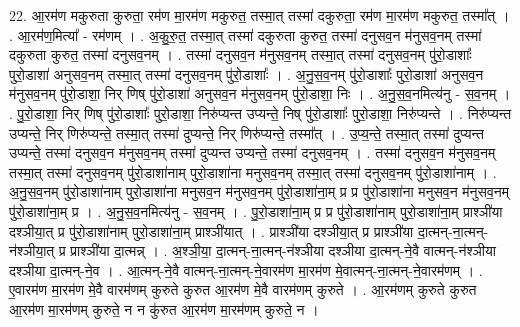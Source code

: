 \documentclass[17pt]{extarticle}
\begin{document}
22. आ॒रम॑ण मकुरुता कुरुता॒ रम॑ण मा॒रम॑ण मकुरुत॒ तस्मा॒त् तस्मा॑ दकुरुता॒ रम॑ण मा॒रम॑ण मकुरुत॒ तस्मा᳚त् । . आ॒रम॑ण॒मित्या᳚ - रम॑णम् । . अ॒कु॒रु॒त॒ तस्मा॒त् तस्मा॑ दकुरुता कुरुत॒ तस्मा॑ दनुसव॒न म॑नुसव॒नम् तस्मा॑ दकुरुता कुरुत॒ तस्मा॑ दनुसव॒नम् । . तस्मा॑ दनुसव॒न म॑नुसव॒नम् तस्मा॒त् तस्मा॑ दनुसव॒नम् पु॑रो॒डाशाः᳚ पुरो॒डाशा॑ अनुसव॒नम् तस्मा॒त् तस्मा॑ दनुसव॒नम् पु॑रो॒डाशाः᳚ । . अ॒नु॒स॒व॒नम् पु॑रो॒डाशाः᳚ पुरो॒डाशा॑ अनुसव॒न म॑नुसव॒नम् पु॑रो॒डाशा॒ निर् णिष् पु॑रो॒डाशा॑ अनुसव॒न म॑नुसव॒नम् पु॑रो॒डाशा॒ निः । . अ॒नु॒स॒व॒नमित्य॑नु - स॒व॒नम् । . पु॒रो॒डाशा॒ निर् णिष् पु॑रो॒डाशाः᳚ पुरो॒डाशा॒ निरु॑प्यन्त उप्यन्ते॒ निष् पु॑रो॒डाशाः᳚ पुरो॒डाशा॒ निरु॑प्यन्ते । . निरु॑प्यन्त उप्यन्ते॒ निर् णिरु॑प्यन्ते॒ तस्मा॒त् तस्मा॑ दुप्यन्ते॒ निर् णिरु॑प्यन्ते॒ तस्मा᳚त् । . उ॒प्य॒न्ते॒ तस्मा॒त् तस्मा॑ दुप्यन्त उप्यन्ते॒ तस्मा॑ दनुसव॒न म॑नुसव॒नम् तस्मा॑ दुप्यन्त उप्यन्ते॒ तस्मा॑ दनुसव॒नम् । . तस्मा॑ दनुसव॒न म॑नुसव॒नम् तस्मा॒त् तस्मा॑ दनुसव॒नम् पु॑रो॒डाशा॑नाम् पुरो॒डाशा॑ना मनुसव॒नम् तस्मा॒त् तस्मा॑ दनुसव॒नम् पु॑रो॒डाशा॑नाम् । . अ॒नु॒स॒व॒नम् पु॑रो॒डाशा॑नाम् पुरो॒डाशा॑ना मनुसव॒न म॑नुसव॒नम् पु॑रो॒डाशा॑ना॒म् प्र प्र पु॑रो॒डाशा॑ना मनुसव॒न म॑नुसव॒नम् पु॑रो॒डाशा॑ना॒म् प्र । . अ॒नु॒स॒व॒नमित्य॑नु - स॒व॒नम् । . पु॒रो॒डाशा॑ना॒म् प्र प्र पु॑रो॒डाशा॑नाम् पुरो॒डाशा॑ना॒म् प्राश्ञी॑या दश्ञीया॒त् प्र पु॑रो॒डाशा॑नाम् पुरो॒डाशा॑ना॒म् प्राश्ञी॑यात् । . प्राश्ञी॑या दश्ञीया॒त् प्र प्राश्ञी॑या दा॒त्मन्-ना॒त्मन्-न॑श्ञीया॒त् प्र प्राश्ञी॑या दा॒त्मन्न् । . अ॒श्ञी॒या॒ दा॒त्मन्-ना॒त्मन्-न॑श्ञीया दश्ञीया दा॒त्मन्-ने॒वै वात्मन्-न॑श्ञीया दश्ञीया दा॒त्मन्-ने॒व । . आ॒त्मन्-ने॒वै वात्मन्-ना॒त्मन्-ने॒वारम॑ण मा॒रम॑ण मे॒वात्मन्-ना॒त्मन्-ने॒वारम॑णम् । . ए॒वारम॑ण मा॒रम॑ण मे॒वै वारम॑णम् कुरुते कुरुत आ॒रम॑ण मे॒वै वारम॑णम् कुरुते । . आ॒रम॑णम् कुरुते कुरुत आ॒रम॑ण मा॒रम॑णम् कुरुते॒ न न कु॑रुत आ॒रम॑ण मा॒रम॑णम् कुरुते॒ न । \newline
\end{document}
